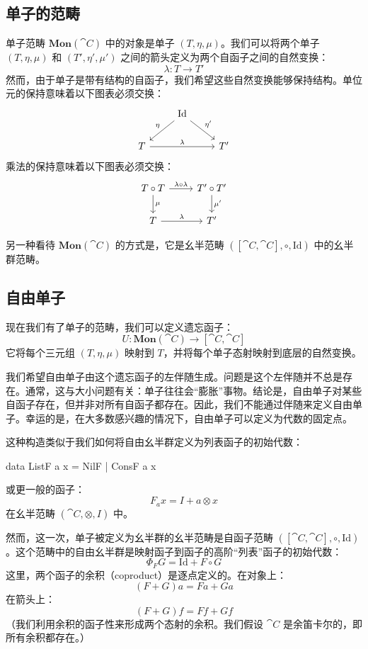 \documentclass[DaoFP]{subfiles}
\begin{document}
\subsection{单子的范畴}

单子范畴 $\mathbf{Mon}(\cat C)$ 中的对象是单子 $(T, \eta, \mu)$。我们可以将两个单子 $(T, \eta, \mu)$ 和 $(T', \eta', \mu')$ 之间的箭头定义为两个自函子之间的自然变换：
\[ \lambda \colon T \to T' \]
然而，由于单子是带有结构的自函子，我们希望这些自然变换能够保持结构。单位元的保持意味着以下图表必须交换：
\[
 \begin{tikzcd}
&\text{Id}
 \arrow[ld, "\eta"']
 \arrow[rd, "\eta'"]
 \\
 T
 \arrow[rr, "\lambda"]
 && T'
 \end{tikzcd}
\]
乘法的保持意味着以下图表必须交换：
\[
 \begin{tikzcd}
 T \circ T
 \arrow[r, "\lambda \circ \lambda"]
 \arrow[d, "\mu"]
 & T' \circ T'
 \arrow[d, "\mu'"]
 \\
 T
 \arrow[r, "\lambda"]
 & T'
 \end{tikzcd}
\]

另一种看待 $\mathbf{Mon}(\cat C)$ 的方式是，它是幺半范畴 $([\cat C, \cat C], \circ, \text{Id})$ 中的幺半群范畴。

\subsection{自由单子}

现在我们有了单子的范畴，我们可以定义遗忘函子：
\[ U \colon \mathbf{Mon}(\cat C) \to [\cat C, \cat C] \]
它将每个三元组 $(T, \eta, \mu)$ 映射到 $T$，并将每个单子态射映射到底层的自然变换。

我们希望自由单子由这个遗忘函子的左伴随生成。问题是这个左伴随并不总是存在。通常，这与大小问题有关：单子往往会“膨胀”事物。结论是，自由单子对某些自函子存在，但并非对所有自函子都存在。因此，我们不能通过伴随来定义自由单子。幸运的是，在大多数感兴趣的情况下，自由单子可以定义为代数的固定点。

这种构造类似于我们如何将自由幺半群定义为列表函子的初始代数：
\begin{haskell}
data ListF a x = NilF | ConsF a x
\end{haskell}
或更一般的函子：
\[ F_a x = I + a \otimes x \]
在幺半范畴 $(\cat C, \otimes, I)$ 中。

然而，这一次，单子被定义为幺半群的幺半范畴是自函子范畴 $([\cat C, \cat C], \circ, \text{Id})$。这个范畴中的自由幺半群是映射函子到函子的高阶“列表”函子的初始代数：
\[ \Phi_F G = \text{Id} + F \circ G \]
这里，两个函子的余积（coproduct）是逐点定义的。在对象上：
\[ (F + G) a = F a + G a \]
在箭头上：
\[ (F + G) f = F f + G f \]
（我们利用余积的函子性来形成两个态射的余积。我们假设 $\cat C$ 是余笛卡尔的，即所有余积都存在。）
\end{document}
